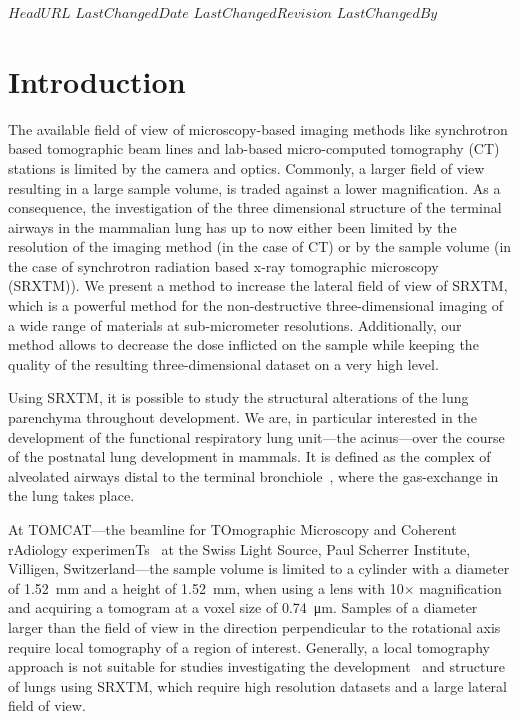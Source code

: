 \svnidlong
{$HeadURL$}
{$LastChangedDate$}
{$LastChangedRevision$}
{$LastChangedBy$}
%
\section{Introduction}
The available field of view of microscopy-based imaging methods like synchrotron based tomographic beam lines and lab-based micro-computed tomography (\micro CT) stations is limited by the camera and optics. Commonly, a larger field of view resulting in a large sample volume, is traded against a lower magnification. As a consequence, the investigation of the three dimensional structure of the terminal airways in the mammalian lung has up to now either been limited by the resolution of the imaging method (in the case of \micro CT) or by the sample volume (in the case of synchrotron radiation based x-ray tomographic microscopy (SRXTM)). We present a method to increase the lateral field of view of SRXTM, which is a powerful method for the non-destructive three-dimensional imaging of a wide range of materials at sub-micrometer resolutions. Additionally, our method allows to decrease the dose inflicted on the sample while keeping the quality of the resulting three-dimensional dataset on a very high level.

Using SRXTM, it is possible to study the structural alterations of the lung parenchyma throughout development. We are, in particular interested in the development of the functional respiratory lung unit---the acinus---over the course of the postnatal lung development in mammals. It is defined as the complex of alveolated airways distal to the terminal bronchiole~\cite{Rodriguez1987}, where the gas-exchange in the lung takes place.

At TOMCAT---the beamline for TOmographic Microscopy and Coherent rAdiology experimenTs~\cite{Stampanoni2007} at the Swiss Light Source, Paul Scherrer Institute, Villigen, Switzerland---the sample volume is limited to a cylinder with a diameter of \SI{1.52}{\milli\meter} and a height of \SI{1.52}{\milli\meter}, when using a lens with 10$\times$ magnification and acquiring a tomogram at a voxel size of \SI{0.74}{\micro\meter}. Samples of a diameter larger than the field of view in the direction perpendicular to the rotational axis require local tomography of a region of interest. Generally, a local tomography approach is not suitable for studies investigating the development~\cite{Schittny2008,Mund2008,Haberthuer2009c} and structure~\cite{Tsuda2008} of lungs using SRXTM, which require high resolution datasets and a large lateral field of view.

